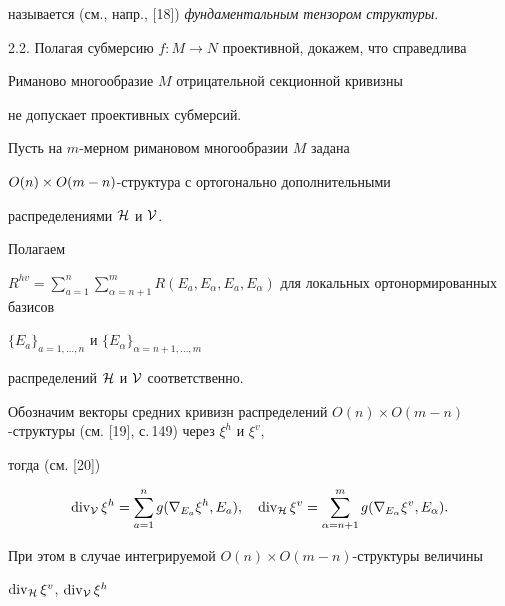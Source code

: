 называется (см., напр., [18]) {\it фундаментальным тензором структуры}. 


\medskip 


 


2.2. Полагая субмерсию $f:M\to N$ проективной, докажем, что справедлива 


 


\begin{thm} Риманово многообразие $M$ отрицательной секционной кривизны 


не допускает проективных субмерсий. 


\end{thm} 


 


\begin{pf} Пусть на $m$-мерном римановом многообразии $M$ задана 


$O(n)\times\linebreak O(m-n)$-структура с ортогонально дополнительными 


распределениями $\cal H$ и $\cal V$. 


Полагаем 


$R^{hv}=\sum\limits^n_{a=1}\sum\limits^m_{\alpha=n+1} 


R(E_a,E_\alpha,E_a,E_\alpha)$ для локальных ортонормированных базисов 


$\{E_a\}_{a=1,\dotsc,n}$ и $\{E_\alpha\}_{\alpha=n+1,\dotsc,m}$ 


распределений $\cal H$ и $\cal V$ соответственно. 


 


Обозначим векторы средних кривизн распределений $O(n)\times


O(m-n)$-структуры (см. [19], с.\,149) через $\xi^h$ и $\xi^v$,


тогда (см. [20]) 


$$ 


\Div_{\cal V}\xi^h=\sum^n_{a=1}g(\nabla_{E_a}\xi^h,E_a),\quad 


\Div_{\cal 


H}\xi^v=\sum^m_{\alpha=n+1}g(\nabla_{E_\alpha}\xi^v,E_\alpha). 


$$ 


При этом в случае интегрируемой $O(n)\times O(m-n)$-структуры величины 


$\operatorname{div}_{\cal H}\xi^v$, $\operatorname{div}_{\cal V}\xi^h$ 



\end{pf}
